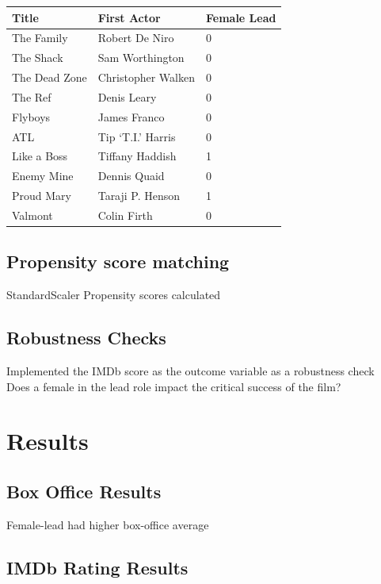 \documentclass[
]{agujournal2019}
\begin{document}
\begin{longtable}[]{@{}lll@{}}
\toprule\noalign{}
Title & First Actor & Female Lead \\
\midrule\noalign{}
\endhead
\bottomrule\noalign{}
\endlastfoot
The Family & Robert De Niro & 0 \\
The Shack & Sam Worthington & 0 \\
The Dead Zone & Christopher Walken & 0 \\
The Ref & Denis Leary & 0 \\
Flyboys & James Franco & 0 \\
ATL & Tip `T.I.' Harris & 0 \\
Like a Boss & Tiffany Haddish & 1 \\
Enemy Mine & Dennis Quaid & 0 \\
Proud Mary & Taraji P. Henson & 1 \\
Valmont & Colin Firth & 0 \\
\end{longtable}

\subsection{Propensity score matching}\label{propensity-score-matching}

StandardScaler Propensity scores calculated

\subsection{Robustness Checks}\label{robustness-checks}

Implemented the IMDb score as the outcome variable as a robustness
check\\
Does a female in the lead role impact the critical success of the film?

\section{Results}\label{sec-results}

\subsection{Box Office Results}\label{box-office-results}

Female-lead had higher box-office average

\subsection{IMDb Rating Results}\label{imdb-rating-results}
\end{document}
